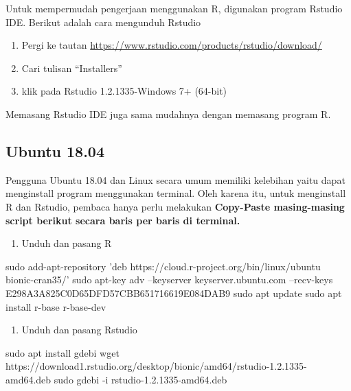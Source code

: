 \documentclass[]{book}
\newenvironment{Shaded}{\begin{snugshade}}{\end{snugshade}}
\newcommand{\StringTok}[1]{\textcolor[rgb]{0.31,0.60,0.02}{#1}}
\newcommand{\FunctionTok}[1]{\textcolor[rgb]{0.00,0.00,0.00}{#1}}
\newcommand{\NormalTok}[1]{#1}
\providecommand{\tightlist}{%
  \setlength{\itemsep}{0pt}\setlength{\parskip}{0pt}}
\begin{document}
Untuk mempermudah pengerjaan menggunakan R, digunakan program Rstudio
IDE. Berikut adalah cara mengunduh Rstudio

\begin{enumerate}
\def\labelenumi{\arabic{enumi}.}
\tightlist
\item
  Pergi ke tautan
  \url{https://www.rstudio.com/products/rstudio/download/}
\item
  Cari tulisan ``Installers''
\item
  klik pada Rstudio 1.2.1335-Windows 7+ (64-bit)
\end{enumerate}

Memasang Rstudio IDE juga sama mudahnya dengan memasang program R.

\subsection*{Ubuntu 18.04}\label{ubuntu-18.04}

Pengguna Ubuntu 18.04 dan Linux secara umum memiliki kelebihan yaitu
dapat menginstall program menggunakan terminal. Oleh karena itu, untuk
menginstall R dan Rstudio, pembaca hanya perlu melakukan
\textbf{Copy-Paste masing-masing script berikut secara baris per baris
di terminal.}

\begin{enumerate}
\def\labelenumi{\arabic{enumi}.}
\tightlist
\item
  Unduh dan pasang R
\end{enumerate}

\begin{Shaded}
\begin{Highlighting}[]
\FunctionTok{sudo}\NormalTok{ add-apt-repository }\StringTok{'deb https://cloud.r-project.org/bin/linux/ubuntu bionic-cran35/'}
\FunctionTok{sudo}\NormalTok{ apt-key adv --keyserver keyserver.ubuntu.com --recv-keys E298A3A825C0D65DFD57CBB651716619E084DAB9}
\FunctionTok{sudo}\NormalTok{ apt update}
\FunctionTok{sudo}\NormalTok{ apt install r-base r-base-dev}
\end{Highlighting}
\end{Shaded}

\begin{enumerate}
\def\labelenumi{\arabic{enumi}.}
\setcounter{enumi}{1}
\tightlist
\item
  Unduh dan pasang Rstudio
\end{enumerate}

\begin{Shaded}
\begin{Highlighting}[]
\FunctionTok{sudo}\NormalTok{ apt install gdebi}
\FunctionTok{wget}\NormalTok{ https://download1.rstudio.org/desktop/bionic/amd64/rstudio-1.2.1335-amd64.deb}
\FunctionTok{sudo}\NormalTok{ gdebi -i rstudio-1.2.1335-amd64.deb}
\end{Highlighting}
\end{Shaded}
\end{document}
